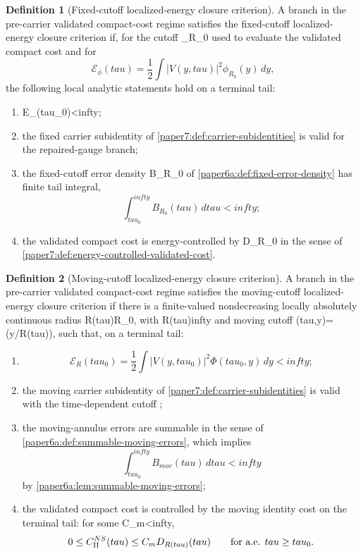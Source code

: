 \documentclass[11pt]{amsart}
\def\({}%
\def\){}%
\def\tilde#1{#1}%
\def\mathfrak#1{#1}%
\def\mathrm#1{#1}%
\def\tau{tau}%
\def\infty{infty}%
\theoremstyle{plain}
\theoremstyle{definition}
\newtheorem{definition}[definition]{Definition}
\theoremstyle{remark}
\begin{document}
\begin{definition}[Fixed-cutoff localized-energy closure criterion]
\label{paper7:def:fixed-carrier-closure-package}
A branch in the pre-carrier validated compact-cost regime satisfies the
fixed-cutoff localized-energy closure criterion if, for the cutoff \(\phi_{R_0}\) used to
evaluate the validated compact cost and for
\[
  \mathcal E_\phi(\tau)=\frac12\int |V(y,\tau)|^2\phi_{R_0}(y)\,dy,
\]
the following local analytic statements hold on a terminal tail:
\begin{enumerate}[label=\textup{(\roman*)}]
\item \(\mathcal E_\phi(\tau_0)<\infty\);
\item the fixed carrier subidentity of
\cref{paper7:def:carrier-subidentities} is valid for the repaired-gauge branch;
\item the fixed-cutoff error density \(B_{R_0}\) of
\cref{paper6a:def:fixed-error-density} has finite tail integral,
\[
  \int_{\tau_0}^{\infty}B_{R_0}(\tau)\,d\tau<\infty;
\]
\item the validated compact cost is energy-controlled by
\(\tilde{\mathfrak D}_{R_0}\) in the sense of
\cref{paper7:def:energy-controlled-validated-cost}.
\end{enumerate}
\end{definition}

\begin{definition}[Moving-cutoff localized-energy closure criterion]
\label{paper7:def:moving-carrier-closure-package}
A branch in the pre-carrier validated compact-cost regime satisfies the
moving-cutoff localized-energy closure criterion if there is a finite-valued
nondecreasing locally absolutely continuous radius \(R(\tau)\ge R_0\), with
\(R(\tau)\to\infty\) and moving cutoff
\(\Phi(\tau,y)=\phi(y/R(\tau))\), such that, on a terminal tail:
\begin{enumerate}[label=\textup{(\roman*)}]
\item
\[
  \mathcal E_R(\tau_0)
  =
  \frac12\int |V(y,\tau_0)|^2\Phi(\tau_0,y)\,dy
  <\infty;
\]
\item the moving carrier subidentity of
\cref{paper7:def:carrier-subidentities} is valid with the time-dependent cutoff
\(\Phi\);
\item the moving-annulus errors are summable in the sense of
\cref{paper6a:def:summable-moving-errors}, which implies
\[
  \int_{\tau_0}^{\infty}B_{\mathrm{mov}}(\tau)\,d\tau<\infty
\]
by \cref{paper6a:lem:summable-moving-errors};
\item the validated compact cost is controlled by the moving identity cost on
the terminal tail: for some \(C_m<\infty\),
\[
  0\le \mathfrak C_{\rm II}^{NS}(\tau)
  \le C_m\tilde{\mathfrak D}_{R(\tau)}(\tau)
  \qquad\text{for a.e. }\tau\ge\tau_0 .
\]
\end{enumerate}
\end{definition}
\end{document}
